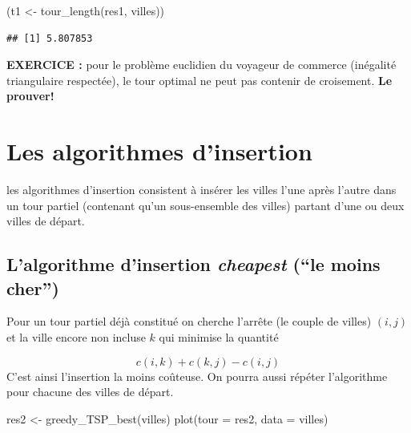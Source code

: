\documentclass[
]{article}
\newenvironment{Shaded}{\begin{snugshade}}{\end{snugshade}}
\newcommand{\AttributeTok}[1]{\textcolor[rgb]{0.77,0.63,0.00}{#1}}
\newcommand{\FunctionTok}[1]{\textcolor[rgb]{0.00,0.00,0.00}{#1}}
\newcommand{\NormalTok}[1]{#1}
\newcommand{\OtherTok}[1]{\textcolor[rgb]{0.56,0.35,0.01}{#1}}
\begin{document}
\begin{Shaded}
\begin{Highlighting}[]
\NormalTok{(t1 }\OtherTok{\textless{}{-}} \FunctionTok{tour\_length}\NormalTok{(res1, villes))}
\end{Highlighting}
\end{Shaded}

\begin{verbatim}
## [1] 5.807853
\end{verbatim}

\textbf{EXERCICE :} pour le problème euclidien du voyageur de commerce
(inégalité triangulaire respectée), le tour optimal ne peut pas contenir
de croisement. \textbf{Le prouver!}

\hypertarget{les-algorithmes-dinsertion}{%
\section{Les algorithmes d'insertion}\label{les-algorithmes-dinsertion}}

les algorithmes d'insertion consistent à insérer les villes l'une après
l'autre dans un tour partiel (contenant qu'un sous-ensemble des villes)
partant d'une ou deux villes de départ.

\hypertarget{lalgorithme-dinsertion-cheapest-le-moins-cher}{%
\subsection{\texorpdfstring{L'algorithme d'insertion \emph{cheapest}
(``le moins
cher'')}{L'algorithme d'insertion cheapest (``le moins cher'')}}\label{lalgorithme-dinsertion-cheapest-le-moins-cher}}

Pour un tour partiel déjà constitué on cherche l'arrête (le couple de
villes) \((i,j)\) et la ville encore non incluse \(k\) qui minimise la
quantité

\[c(i,k) + c(k,j) - c(i,j)\] C'est ainsi l'insertion la moins coûteuse.
On pourra aussi répéter l'algorithme pour chacune des villes de départ.

\begin{Shaded}
\begin{Highlighting}[]
\NormalTok{res2 }\OtherTok{\textless{}{-}} \FunctionTok{greedy\_TSP\_best}\NormalTok{(villes)}
\FunctionTok{plot}\NormalTok{(}\AttributeTok{tour =}\NormalTok{ res2, }\AttributeTok{data =}\NormalTok{ villes)}
\end{Highlighting}
\end{Shaded}
\end{document}
